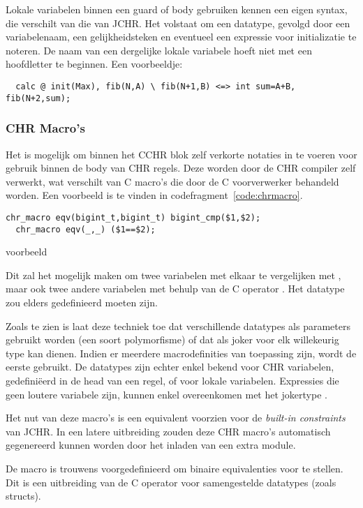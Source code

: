 Lokale variabelen binnen een guard of body gebruiken kennen een eigen syntax, die verschilt van die van JCHR. Het volstaat om een datatype, gevolgd door een variabelenaam, een gelijkheidsteken en eventueel een expressie voor initializatie te noteren. De naam van een dergelijke lokale variabele hoeft niet met een hoofdletter te beginnen. Een voorbeeldje: \begin{Verbatim}
  calc @ init(Max), fib(N,A) \ fib(N+1,B) <=> int sum=A+B, fib(N+2,sum);
\end{Verbatim}

\subsubsection{CHR Macro's}

Het is mogelijk om binnen het CCHR blok zelf verkorte notaties in te voeren voor gebruik binnen de body van CHR regels. Deze worden door de CHR compiler zelf verwerkt, wat verschilt van C macro's die door de C voorverwerker behandeld worden. Een voorbeeld is te vinden in codefragment~\ref{code:chrmacro}.
\begin{exCode}
\begin{Verbatim}[frame=single]
  chr_macro eqv(bigint_t,bigint_t) bigint_cmp($1,$2);
  chr_macro eqv(_,_) ($1==$2);
\end{Verbatim}
\caption{ voorbeeld}
\label{code:chrmacro}
\end{exCode}
Dit zal het mogelijk maken om twee  variabelen met elkaar te vergelijken met , maar ook twee andere variabelen met behulp van de C operator \code{==}. Het datatype  zou elders gedefinieerd moeten zijn.

Zoals te zien is laat deze techniek toe dat verschillende datatypes als parameters gebruikt worden (een soort polymorfisme) of dat \code{\_} als joker voor elk willekeurig type kan dienen. Indien er meerdere macrodefinities van toepassing zijn, wordt de eerste gebruikt. De datatypes zijn echter enkel bekend voor CHR variabelen, gedefini\"eerd in de head van een regel, of voor lokale variabelen. Expressies die geen loutere variabele zijn, kunnen enkel overeenkomen met het jokertype \code{\_}.

Het nut van deze macro's is een equivalent voorzien voor de {\em built-in constraints} van JCHR. In een latere uitbreiding zouden deze CHR macro's automatisch gegenereerd kunnen worden door het inladen van een extra module.

De macro  is trouwens voorgedefinieerd om binaire equivalenties voor te stellen. Dit is een uitbreiding van de C operator \code{==} voor samengestelde datatypes (zoals structs).

